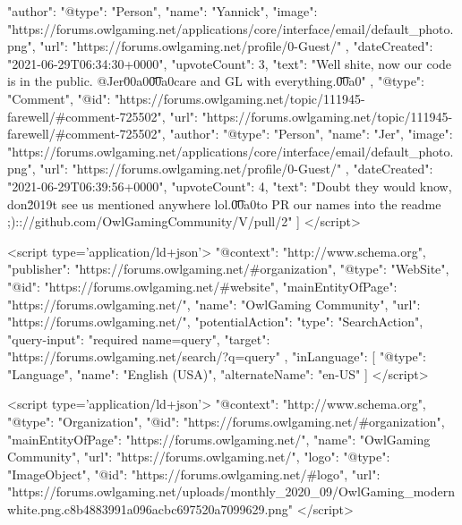 {{            "author": {
                "@type": "Person",
                "name": "Yannick",
                "image": "https://forums.owlgaming.net/applications/core/interface/email/default_photo.png",
                "url": "https://forums.owlgaming.net/profile/0-Guest/"
            },
            "dateCreated": "2021-06-29T06:34:30+0000",
            "upvoteCount": 3,
            "text": "Well shite, now our code is in the public. @Jer\u00a0\n \n\n\n\t\u00a0\n \n\n\n\tTake care and GL with everything.\n \n\n\n\t\u00a0\n \n"
        },
        {
            "@type": "Comment",
            "@id": "https://forums.owlgaming.net/topic/111945-farewell/#comment-725502",
            "url": "https://forums.owlgaming.net/topic/111945-farewell/#comment-725502",
            "author": {
                "@type": "Person",
                "name": "Jer",
                "image": "https://forums.owlgaming.net/applications/core/interface/email/default_photo.png",
                "url": "https://forums.owlgaming.net/profile/0-Guest/"
            },
            "dateCreated": "2021-06-29T06:39:56+0000",
            "upvoteCount": 4,
            "text": "Doubt they would know, don\u2019t see us mentioned anywhere lol.\n \n\n\n\t\u00a0\n \n\n\n\tTime to PR our names into the readme ;)\n \n\n\n\tupdate:\n \n\n\n\thttps://github.com/OwlGamingCommunity/V/pull/2\n \n"
        }
    ]
}	
</script>

<script type='application/ld+json'>
{
    "@context": "http://www.schema.org",
    "publisher": "https://forums.owlgaming.net/#organization",
    "@type": "WebSite",
    "@id": "https://forums.owlgaming.net/#website",
    "mainEntityOfPage": "https://forums.owlgaming.net/",
    "name": "OwlGaming Community",
    "url": "https://forums.owlgaming.net/",
    "potentialAction": {
        "type": "SearchAction",
        "query-input": "required name=query",
        "target": "https://forums.owlgaming.net/search/?q={query}"
    },
    "inLanguage": [
        {
            "@type": "Language",
            "name": "English (USA)",
            "alternateName": "en-US"
        }
    ]
}	
</script>

<script type='application/ld+json'>
{
    "@context": "http://www.schema.org",
    "@type": "Organization",
    "@id": "https://forums.owlgaming.net/#organization",
    "mainEntityOfPage": "https://forums.owlgaming.net/",
    "name": "OwlGaming Community",
    "url": "https://forums.owlgaming.net/",
    "logo": {
        "@type": "ImageObject",
        "@id": "https://forums.owlgaming.net/#logo",
        "url": "https://forums.owlgaming.net/uploads/monthly_2020_09/OwlGaming_modernwhite.png.c8b4883991a096acbc697520a7099629.png"
    }
}	
</script>

